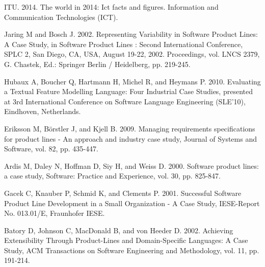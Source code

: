 \documentclass{kais}
\begin{document}
\begin{thebibliography}{99}
 ITU. 2014. The world in 2014: Ict facts and figures. Information and Communication Technologies (ICT).

 Jaring M and Bosch J. 2002. Representing Variability in Software Product Lines: A Case Study, in Software Product Lines : Second International Conference, SPLC 2, San Diego, CA, USA, August 19-22, 2002. Proceedings, vol. LNCS 2379, G. Chastek, Ed.: Springer Berlin / Heidelberg, pp. 219-245.

 Hubaux A, Boucher Q, Hartmann H, Michel R, and Heymans P. 2010. Evaluating a Textual Feature Modelling Language: Four Industrial Case Studies, presented at 3rd International Conference on Software Language Engineering (SLE'10), Eindhoven, Netherlands.

 Eriksson M, Börstler J, and Kjell B. 2009. Managing requirements specifications for product lines - An approach and industry case study, Journal of Systems and Software, vol. 82, pp. 435-447.

 Ardis M, Daley N, Hoffman D, Siy H, and Weiss D. 2000. Software product lines: a case study, Software: Practice and Experience, vol. 30, pp. 825-847.

 Gacek C, Knauber P, Schmid K, and Clements P. 2001. Successful Software Product Line Development in a Small Organization - A Case Study, IESE-Report No. 013.01/E, Fraunhofer IESE.

 Batory D, Johnson C, MacDonald B, and von Heeder D. 2002. Achieving Extensibility Through Product-Lines and Domain-Specific Languages: A Case Study, ACM Transactions on Software Engineering and Methodology, vol. 11, pp. 191-214.

\end{thebibliography}
\end{document}

